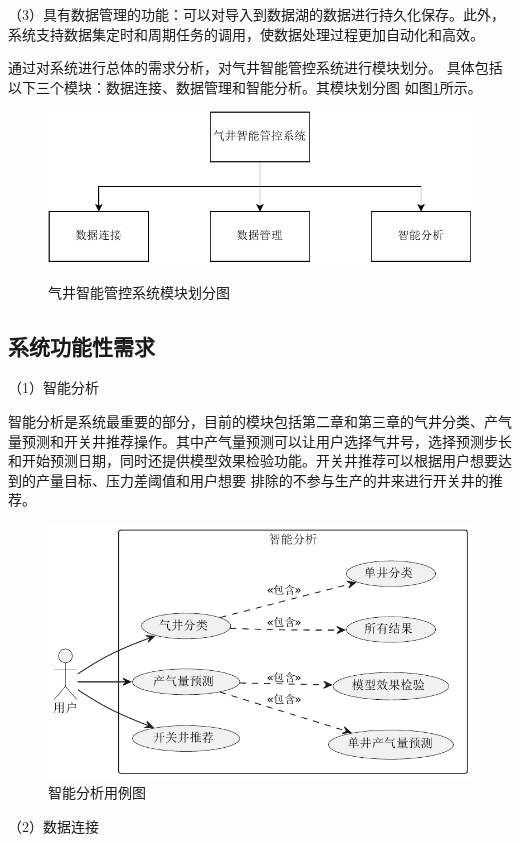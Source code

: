 （3）具有数据管理的功能：可以对导入到数据湖的数据进行持久化保存。此外，系统支持数据集定时和周期任务的调用，使数据处理过程更加自动化和高效。

通过对系统进行总体的需求分析，对气井智能管控系统进行模块划分。
具体包括以下三个模块：数据连接、数据管理和智能分析。其模块划分图
如图\ref{fig:allmodules}所示。
\begin{figure}[H]
    \centering
    \includegraphics[width=.5\linewidth]{figure/systemincludemodles.pdf}
    \label{fig:allmodules}
    \caption{气井智能管控系统模块划分图}
\end{figure}
\subsection{系统功能性需求}
（1）智能分析

智能分析是系统最重要的部分，目前的模块包括第二章和第三章的气井分类、产气量预测和开关井推荐操作。其中产气量预测可以让用户选择气井号，选择预测步长和开始预测日期，同时还提供模型效果检验功能。开关井推荐可以根据用户想要达到的产量目标、压力差阈值和用户想要
排除的不参与生产的井来进行开关井的推荐。
\begin{figure}[H]
    \centering
    \includegraphics[width=.7\linewidth]{figure/智能分析用例图.pdf}
    \caption{智能分析用例图}
    \label{fig:analyusecase}
\end{figure}

（2）数据连接

